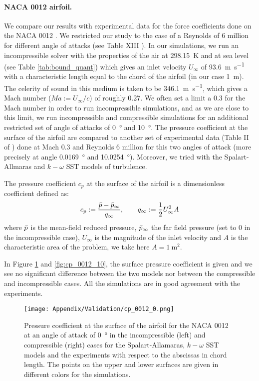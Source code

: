 \begin{subappendices}
	\paragraph{NACA 0012 airfoil.} We compare our results with experimental data for the force coefficients done on the NACA 0012 \cite{NACA0012-1, NACA0012-2}. We restricted our study to the case of a Reynolds of 6 million for different angle of attacks (see Table XIII \cite{NACA0012-2}). In our simulations, we run an incompressible solver with the properties of the air at \SI{298.15}{\kelvin} and at sea level (see Table \ref{tab:bound_quant}) which gives an inlet velocity $U_\infty$ of \SI{93.6}{\meter\per\second} with a characteristic length equal to the chord of the airfoil (in our case \SI{1}{\meter}). The celerity of sound in this medium is taken to be \SI{346.1}{\meter\per\second}, which gives a Mach number ($Ma := U_\infty/c$) of roughly 0.27. We often set a limit a 0.3 for the Mach number in order to run incompressible simulations, and as we are close to this limit, we run incompressible and compressible simulations for an additional restricted set of angle of attacks of \SI{0}{\degree} and \SI{10}{\degree}. The pressure coefficient at the surface of the airfoil are compared to another set of experimental data (Table II of \cite{NACA0012-1}) done at Mach 0.3 and Reynolds 6 million for this two angles of attack (more precisely at angle \SI{0.0169}{\degree} and \SI{10.0254}{\degree}). Moreover, we tried with the Spalart-Allmaras and $k-\omega$ SST models of turbulence.
	
	The pressure coefficient $c_p$ at the surface of the airfoil is a dimensionless coefficient defined as:
	\begin{align}
		c_p := \frac{\Bar{p}-\Bar{p}_\infty}{q_\infty}, \qquad q_\infty := \frac{1}{2}U_\infty^2 A
	\end{align}
	where $\Bar{p}$ is the mean-field reduced pressure, $\Bar{p}_\infty$ the far field pressure (set to 0 in the incompressible case), $U_\infty$ is the magnitude of the inlet velocity and $A$ is the characteristic area of the problem, we take here $A = \SI{1}{\square\meter}$.
	
	In Figure \ref{fig:cp_0012_0} and \ref{fig:cp_0012_10}, the surface pressure coefficient is given and we see no significant difference between the two models nor between the compressible and incompressible cases. All the simulations are in good agreement with the experiments.
	
	\begin{figure}
		\centering
		\texttt{[image: Appendix/Validation/cp\_0012\_0.png]}
		\caption{Pressure coefficient at the surface of the airfoil for the NACA 0012 at an angle of attack of \SI{0}{\degree} in the incompressible (left) and compressible (right) cases for the Spalart-Allamaras,  $k-\omega$ SST models and the experiments with respect to the abscissas in chord length. The points on the upper and lower surfaces are given in different colors for the simulations.}
		\label{fig:cp_0012_0}
	\end{figure}
	

\end{subappendices}
